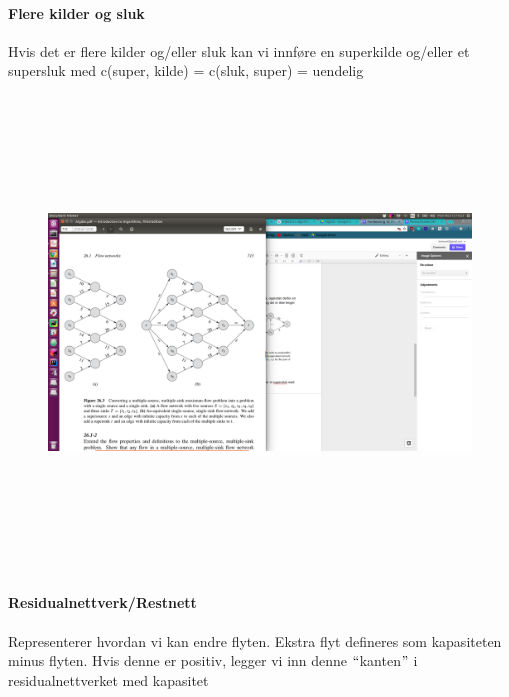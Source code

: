 \documentclass[12pt]{report}
\begin{document}
\par

\paragraph*{Flere kilder og sluk}
Hvis det er flere kilder og/eller sluk kan vi innføre en superkilde og/eller et supersluk med c(super, kilde) = c(sluk, super) = uendelig\par




\begin{figure}[H]
	\begin{Center}
		\includegraphics[width=6.05in,height=4.94in]{./media/image141.png}
	\end{Center}
\end{figure}



\par

\paragraph*{Residualnettverk/Restnett}
Representerer hvordan vi kan endre flyten. Ekstra flyt defineres som kapasiteten minus flyten. Hvis denne er positiv, legger vi inn denne $``$kanten$"$  i residualnettverket med kapasitet \par
\end{document}

